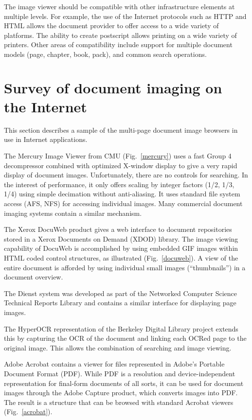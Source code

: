 The image viewer should be compatible with other infrastructure
elements at multiple levels. For example, the use of the Internet
protocols such as HTTP and HTML allows the document provider to offer
access to a wide variety of platforms. The ability to create
postscript allows printing on a wide variety of printers. Other areas
of compatibility include support for multiple document models (page,
chapter, book, pack), and common search operations.

\section{Survey of document imaging on the Internet}

This section describes a sample of the multi-page document image
browsers in use in Internet applications.

The Mercury Image Viewer from CMU\cite{merc} (Fig.\ \ref{mercury}) uses a fast Group 4
decompressor combined with optimized X-window display to give a very rapid display of
document images. Unfortunately, there are no controls for searching.
In the interest of performance, it only offers scaling by integer factors
(1/2, 1/3, 1/4) using simple decimation without anti-aliasing. It uses standard
file system access (AFS, NFS) for accessing individual images. Many
commercial document imaging systems contain a similar mechanism.


The Xerox DocuWeb product gives a web interface to document
repositories stored in a Xerox Documents on Demand (XDOD) library. The
image viewing capability of DocuWeb is accomplished by using embedded
GIF images within HTML coded control structures, as illustrated (Fig.\ \ref{docuweb}). A
view of the entire document is afforded by using individual small
images (``thumbnails'') in a document overview.

The Dienst system\cite{cstr} was developed as part of the Networked
Computer Science Technical Reports Library and contains a
similar interface for displaying page images.

The HyperOCR representation of the Berkeley Digital Library project\cite{berk}
extends this by capturing the OCR of the document and linking each
OCRed page to the original image.  This allows the combination of
searching and image viewing.

Adobe Acrobat contains a viewer for files represented in Adobe's Portable
Document Format (PDF). While PDF is a resolution and
device-independent representation for final-form documents of all
sorts, it can be used for document images through the Adobe Capture
product, which converts images into PDF. The result is a structure
that can be browsed with standard Acrobat viewers (Fig.\ \ref{acrobat}).

